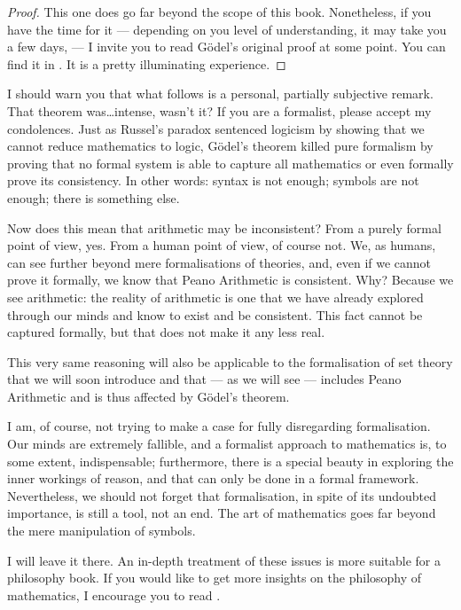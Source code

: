 \begin{proof}
This one does go far beyond the scope of this book. Nonetheless, if you have the time for it --- depending on you level of understanding, it may take you a few days, --- I invite you to read G\"odel's original proof at some point. You can find it in \cite{Godel}. It is a pretty illuminating experience.
\end{proof}

\begin{para}
I should warn you that what follows is a personal, partially subjective remark. That theorem was\ldots intense, wasn't it? If you are a formalist, please accept my condolences.
Just as Russel's paradox sentenced logicism by showing that we cannot reduce mathematics to logic, G\"odel's theorem killed pure formalism by proving that no formal system is able to capture all mathematics or even formally prove its consistency. In other words: syntax is not enough; symbols are not enough; there is something else.

Now does this mean that arithmetic may be inconsistent? 
From a purely formal point of view, yes.
From a human point of view, of course not.
We, as humans, can see further beyond mere formalisations of theories, and, even if we cannot prove it formally, we know that Peano Arithmetic is consistent.
Why? Because we see arithmetic: the reality of arithmetic is one that we have already explored through our minds and know to exist and be consistent.
This fact cannot be captured formally, but that does not make it any less real.

This very same reasoning will also be applicable to the formalisation of set theory that we will soon introduce and that --- as we will see --- includes Peano Arithmetic and is thus affected by G\"odel's theorem.

I am, of course, not trying to make a case for fully disregarding formalisation.
Our minds are extremely fallible, and a formalist approach to mathematics is, to some extent, indispensable;
furthermore, there is a special beauty in exploring the inner workings of reason, and that can only be done in a formal framework.
Nevertheless, we should not forget that formalisation, in spite of its undoubted importance, is still a tool, not an end.
The art of mathematics goes far beyond the mere manipulation of symbols.

I will leave it there. An in-depth treatment of these issues is more suitable for a philosophy book.
If you would like to get more insights on the philosophy of mathematics, I encourage you to read \cite{Brown}.
\end{para}

